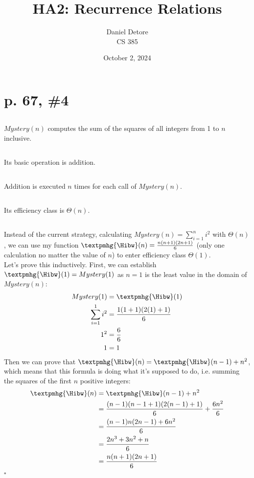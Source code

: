 \documentclass{article}
\title{HA2: Recurrence Relations}
\author{Daniel Detore\\CS 385}
\date{October 2, 2024}
\begin{document}
\maketitle
\raggedright


\section{p. 67, \#4}

\subsection{}
$Mystery(n)$ computes the sum of the squares of all integers from 1 to $n$ inclusive.

\subsection{}
Its basic operation is addition.

\subsection{}
Addition is executed $n$ times for each call of $Mystery(n)$.

\subsection{}
Its efficiency class is $\Theta(n)$.

\subsection{}
Instead of the current strategy, calculating $Mystery(n) = \sum_{i=1}^{n} i^2$ with $\Theta(n)$, we can use my function $\textpmhg{\Hibw}(n) = \frac{n(n+1)(2n+1)}{6}$ (only one calculation no matter the value of $n$) to enter efficiency class $\Theta(1)$.\\
Let's prove this inductively. First, we can establish $\textpmhg{\Hibw}(1) = Mystery(1)$ as $n=1$ is the least value in the domain of $Mystery(n)$:
\begin{align*}
    Mystery(1) &= \textpmhg{\Hibw}(1)\\
    \sum_{i=1}^{1} i^2 &= \frac{1(1+1)(2(1)+1)}{6}\\
    1^2 &= \frac{6}{6}\\
    1 &= 1
\end{align*}
Then we can prove that $\textpmhg{\Hibw}(n) = \textpmhg{\Hibw}(n-1) + n^2$, which means that this formula is doing what it's supposed to do, i.e. summing the squares of the first $n$ positive integers:
\begin{align*}
    \textpmhg{\Hibw}(n) &= \textpmhg{\Hibw}(n-1) + n^2\\
                        &= \frac{(n-1)(n-1+1)(2(n-1)+1)}{6} + \frac{6n^2}{6}\\
                        &= \frac{(n-1)n(2n-1)+ 6n^2}{6}\\
                        &= \frac{2n^3+3n^2+n}{6}\\
                        &= \frac{n(n+1)(2n+1)}{6}
\end{align*}
$\square$
\end{document}
